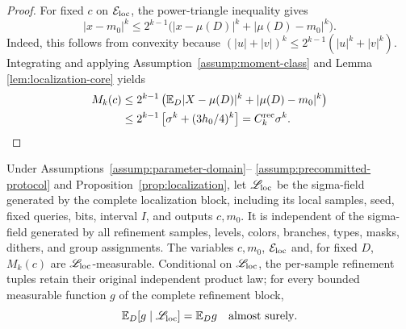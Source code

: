 \begin{proof}
For fixed $c$ on $\mathcal E_{\rm loc}$, the power-triangle inequality gives
\[
 |x-m_0|^k
 \leq2^{k-1}\bigl(|x-\mu(D)|^k+|\mu(D)-m_0|^k\bigr).
\]
Indeed, this follows from convexity because
$(|u|+|v|)^k\leq2^{k-1}(|u|^k+|v|^k)$.  Integrating and applying
Assumption~\ref{assump:moment-class} and Lemma~
\ref{lem:localization-core} yields
\[
\begin{aligned}
 M_k(c)
 &\leq2^{k-1}\left(\mathbb E_D|X-\mu(D)|^k
          +|\mu(D)-m_0|^k\right)\\
 &\leq2^{k-1}\left[\sigma^k+(3h_0/4)^k\right]
 =C_k^{\rm rec}\sigma^k.
\end{aligned}
\]
\end{proof}

\begin{proposition}
\label{prop:refinement-independence}
Under Assumptions~\ref{assump:parameter-domain}--
\ref{assump:precommitted-protocol} and Proposition~\ref{prop:localization},
let $\mathscr L_{\rm loc}$ be the sigma-field generated by the complete
localization block, including its local samples, seed, fixed queries, bits,
interval $I$, and outputs $c,m_0$.  It is independent of the sigma-field
generated by all refinement samples, levels, colors, branches, types, masks,
dithers, and group assignments.  The variables $c,m_0$,
$\mathcal E_{\rm loc}$ and, for fixed $D$, $M_k(c)$ are
$\mathscr L_{\rm loc}$-measurable.  Conditional on
$\mathscr L_{\rm loc}$, the per-sample refinement tuples retain their
original independent product law; for every bounded measurable function $g$
of the complete refinement block,
\[
 \mathbb E_D[g\mid\mathscr L_{\rm loc}]=\mathbb E_Dg
 \quad\text{almost surely}.
\]
\end{proposition}

